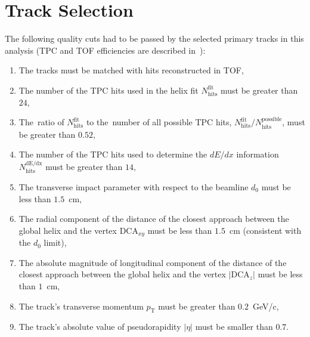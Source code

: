 \section{Track Selection}\label{section:star_track_selection}
The following quality cuts had to be passed by the selected primary tracks in this analysis (TPC and TOF efficiencies are described in~\cite{supplementaryNote}):
\begin{enumerate}
	\item The tracks must be matched with hits reconstructed in TOF,
	\item The number of the  TPC hits used in the helix fit $N_{\textrm{hits}}^{\textrm{fit}}$ must be greater than $24$,
	\item The~ratio of $N_{\textrm{hits}}^{\textrm{fit}}$ to the~number of all possible TPC hits, $N_{\textrm{hits}}^{\textrm{fit}}/N_{\textrm{hits}}^{\textrm{possible}}$, must be greater than $0.52$,
	\item The number of the  TPC hits used to determine the $dE/dx$ information $N_{\textrm{hits}}^{\textrm{dE/dx}}$ must be greater than $14$,
	\item The transverse impact parameter with respect to the beamline $d_0$ must be less than $1.5$~cm,
	\item The radial component of the distance of the closest approach between  the global helix and the vertex $\textrm{DCA}_{xy}$ must be less than $1.5$~cm (consistent with the $d_0$ limit),
	\item The absolute magnitude of  longitudinal component of the distance of the closest approach between  the global helix and the vertex $|\textrm{DCA}_{z}|$ must be less than $1$~cm,
	\item The track's transverse momentum $p_\textrm{T}$ must be greater than $0.2$~GeV/c,
	\item The track's absolute value of  pseudorapidity $|\eta|$ must be smaller than $0.7$.
\end{enumerate}

